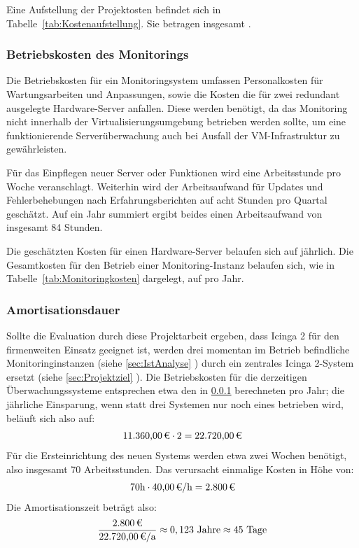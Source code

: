 Eine Aufstellung der Projektosten befindet sich in Tabelle~\ref{tab:Kostenaufstellung}. Sie betragen insgesamt .

\subsubsection{Betriebskosten des Monitorings}
\label{sec:BetriebskostenMonitoring}
Die Betriebskosten für ein Monitoringsystem umfassen Personalkosten für Wartungsarbeiten und Anpassungen, sowie die Kosten die für zwei redundant ausgelegte Hardware-Server anfallen. Diese werden benötigt, da das Monitoring nicht innerhalb der Virtualisierungsumgebung betrieben werden sollte, um eine funktionierende Serverüberwachung auch bei Ausfall der VM-Infrastruktur zu gewährleisten.

Für das Einpflegen neuer Server oder Funktionen wird eine Arbeitsstunde pro Woche veranschlagt. Weiterhin wird der Arbeitsaufwand für Updates und Fehlerbehebungen nach Erfahrungsberichten auf acht Stunden pro Quartal geschätzt. Auf ein Jahr summiert ergibt beides einen Arbeitsaufwand von insgesamt 84 Stunden.

Die geschätzten Kosten für einen Hardware-Server belaufen sich auf  jährlich. Die Gesamtkosten für den Betrieb einer Monitoring-Instanz belaufen sich, wie in Tabelle~\ref{tab:Monitoringkosten} dargelegt, auf  pro Jahr.

\subsubsection{Amortisationsdauer}
\label{sec:Amortisationsdauer}
Sollte die Evaluation durch diese Projektarbeit ergeben, dass \glqq{}Icinga 2\grqq{} für den firmenweiten Einsatz geeignet ist, werden drei momentan im Betrieb befindliche Monitoringinstanzen (siehe \ref{sec:IstAnalyse} ) durch ein zentrales \glqq{}Icinga 2\grqq{}-System ersetzt (siehe \ref{sec:Projektziel} ). Die Betriebskosten für die derzeitigen Überwachungssysteme entsprechen etwa den in \ref{sec:BetriebskostenMonitoring}  berechneten  pro Jahr; die jährliche Einsparung, wenn statt drei Systemen nur noch eines betrieben wird, beläuft sich also auf:
\begin{eqnarray}
\eur{11.360,00} \cdot 2 = \eur{22.720,00}
\end{eqnarray}
Für die Ersteinrichtung des neuen Systems werden etwa zwei Wochen benötigt, also insgesamt 70 Arbeitsstunden. Das verursacht einmalige Kosten in Höhe von:
\begin{eqnarray}
70 \mbox{h} \cdot \eur{40,00} \mbox{/h} = \eur{2.800}
\end{eqnarray}
Die Amortisationszeit beträgt also:
\begin{eqnarray}
\frac{\eur{2.800}}{\eur{22.720,00}\mbox{/a}} \approx 0,123 \mbox{ Jahre} \approx 45 \mbox{ Tage}
\end{eqnarray}
\setcounter{equation}{0}